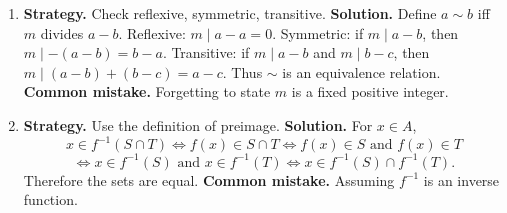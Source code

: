 \documentclass[11pt]{article}
\begin{document}
\begin{enumerate}[label=\textbf{1.\arabic*.}]
\item \textbf{Strategy.} Check reflexive, symmetric, transitive. \textbf{Solution.} Define $a\sim b$ iff $m$ divides $a-b$. Reflexive: $m\mid a-a=0$. Symmetric: if $m\mid a-b$, then $m\mid -(a-b)=b-a$. Transitive: if $m\mid a-b$ and $m\mid b-c$, then $m\mid(a-b)+(b-c)=a-c$. Thus $\sim$ is an equivalence relation. \textbf{Common mistake.} Forgetting to state $m$ is a fixed positive integer.

\item \textbf{Strategy.} Use the definition of preimage. \textbf{Solution.} For $x\in A$,
\[
x\in f^{-1}(S\cap T)\iff f(x)\in S\cap T\iff f(x)\in S\text{ and }f(x)\in T
\]
\[
\iff x\in f^{-1}(S)\text{ and }x\in f^{-1}(T)\iff x\in f^{-1}(S)\cap f^{-1}(T).
\]
Therefore the sets are equal. \textbf{Common mistake.} Assuming $f^{-1}$ is an inverse function.
\end{enumerate}
\end{document}
